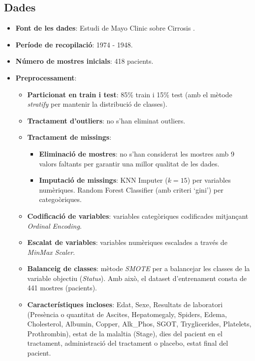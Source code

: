 \subsection{Dades}
\begin{itemize}
\item \textbf{Font de les dades}: Estudi de Mayo Clinic sobre Cirrosis \cite{misc_cirrhosis_patient_survival_prediction_878}.
\item \textbf{Període de recopilació}: 1974 - 1948.
\item \textbf{Número de mostres inicials}: 418 pacients.
\item \textbf{Preprocessament}:
\begin{itemize}
	\item \textbf{Particionat en train i test}: 85\% train i 15\% test (amb el mètode \textit{stratify} per mantenir la distribució de classes).
	\item \textbf{Tractament d'outliers}: no s'han eliminat outliers.
	\item \textbf{Tractament de missings}: 
	\begin{itemize}
		\item \textbf{Eliminació de mostres}: no s'han considerat les mostres amb 9 valors faltants per garantir una millor qualitat de les dades.
		\item \textbf{Imputació de missings}: KNN Imputer ($k=15$) per variables numèriques. Random Forest Classifier (amb criteri `gini') per categoòriques.
	\end{itemize}
	\item \textbf{Codificació de variables}: variables categòriques codificades mitjançant \textit{Ordinal Encoding}.
	\item \textbf{Escalat de variables}: variables numèriques escalades a través de \textit{MinMax Scaler}.
	\item \textbf{Balanceig de classes}: mètode \textit{SMOTE} per a balancejar les classes de la variable objectiu (\textit{Status}). Amb això, el dataset d'entrenament consta de 441 mostres (pacients).
	\item \textbf{Característiques incloses}: Edat, Sexe, Resultats de laboratori (Presència o quantitat de Ascites, Hepatomegaly, Spiders, Edema, Cholesterol, Albumin, Copper, Alk\_Phos, SGOT, Tryglicerides, Platelets, Prothrombin), estat de la malaltia (Stage), dies del pacient en el tractament, administració del tractament o placebo, estat final del pacient.

\end{itemize}
\end{itemize}

